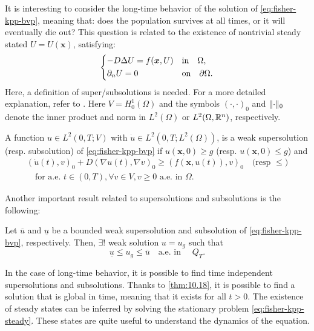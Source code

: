 It is interesting to consider the long-time behavior of the solution of \eqref{eq:fisher-kpp-bvp}, meaning that: does the population survives at all times, or it will eventually die out? This question is related to the existence of nontrivial steady stated \(U = U(\bm{x})\), satisfying:
\begin{equation}
    \begin{dcases}
        -D \Delta U = f(\bm{x}, U) & \text{in} \quad \Omega, \\
        \partial_{n}U = 0 & \text{on} \quad \partial \Omega.
    \end{dcases}
    \label{eq:fisher-kpp-steady} 
\end{equation}
Here, a definition of super/subsolutions is needed. For a more detailed explanation, refer to \cite{SalsaVerziniPDE}. Here \(V = H^1_0(\Omega)\) and the symbols \(\left(\cdot, \cdot\right)_0\) and \(\lVert\cdot\rVert_0\) denote the inner product and norm in \(L^2(\Omega)\) or \(L^2(\Omega, \mathbb{R}^n)\), respectively. 
\begin{definition}
    A function \(u \in L^2(0, T; V)\) with \(\dot{u} \in L^2(0, T; L^2(\Omega))\), is a weak supersolution (resp. subsolution) of \eqref{eq:fisher-kpp-bvp} if \(u(\bm{x}, 0) \geq g\) (resp. \(u(\bm{x}, 0) \leq g\)) and
    \begin{equation}
        \begin{split}
            \left(\dot{u}(t), v\right)_0 + D \left(\nabla u(t), \nabla v\right)_0 \geq (f(\bm{x}, u(t)), v)_0 \quad \text{(resp } \leq \text{)} \\ \quad \text{for a.e. } t \in (0, T), \forall v \in V, v \geq 0 \text{ a.e. in } \Omega.
        \end{split}
    \end{equation}
\end{definition}
Another important result related to supersolutions and subsolutions is the following:
\begin{theorem}
    Let \(\overline{u}\) and \(\underline{u}\) be a bounded weak supersolution and subsolution of \eqref{eq:fisher-kpp-bvp}, respectively. Then, \(\exists!\) weak solution \(u = u_g\) such that
    \begin{equation}
        \underline{u} \leq u_g \leq \overline{u} \quad \text{a.e. in } \quad Q_T.
    \end{equation}
    \label{thm:10.18}
\end{theorem}

In the case of long-time behavior, it is possible to find time independent supersolutions and subsolutions. Thanks to \ref{thm:10.18}, it is possible to find a solution that is global in time, meaning that it exists for all \(t > 0\). 
The existence of steady states can be inferred by solving the stationary problem \eqref{eq:fisher-kpp-steady}. These states are quite useful to understand the dynamics of the equation.